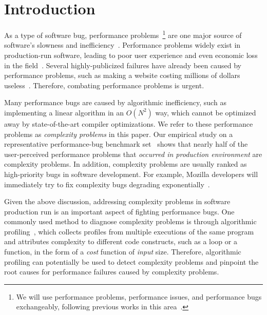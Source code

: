 \section{Introduction}
\label{sec:intro}


As a type of software bug, performance problems~\footnote{We will use performance problems,
performance issues,  and performance bugs exchangeably,
following previous works in this area~\cite{SongOOPSLA2014,ldoctor}.}
are one major source of software's slowness and inefficiency~\cite{PerfBug,perf.fse10,SongOOPSLA2014,ldoctor,Alabama}. 
Performance problems widely exist in production-run software, leading to
poor user experience and  even economic loss in the field~\cite{PerfBug,SongOOPSLA2014,ldoctor}. 
Several highly-publicized failures have already been caused by performance problems,
such as making a website costing millions of dollars useless~\cite{ACA-health}.
Therefore, combating performance problems is urgent.


Many performance bugs are caused by algorithmic inefficiency,
such as implementing a linear algorithm in an $O(N^2)$ way, 
which cannot be optimized away by state-of-the-art 
compiler optimizations. 
We refer to these performance problems as \emph{complexity problems}  in this paper. 
Our empirical study on a representative performance-bug
benchmark set~\cite{PerfBug,SongOOPSLA2014} shows that
nearly half of the user-perceived performance problems that
\emph{occurred in production environment} are complexity problems.
In addition, complexity problems are usually ranked as high-priority bugs in 
software development.  For example, Mozilla developers will immediately try to fix 
complexity bugs degrading exponentially~\cite{mozilla35294}.


Given the above discussion, addressing complexity problems in
software production run is an important aspect of fighting performance bugs. 
One commonly used method to diagnose complexity problems
is through algorithmic profiling~\cite{Aprof1,Aprof2,AlgoProf},
which collects profiles from multiple
executions of the same program and attributes complexity to different code constructs, 
such as a loop or a function, in the form of a \textit{cost} function of \textit{input} size.
Therefore, algorithmic profiling can potentially be used to detect complexity problems and
pinpoint the root causes for performance failures caused by complexity problems. 


